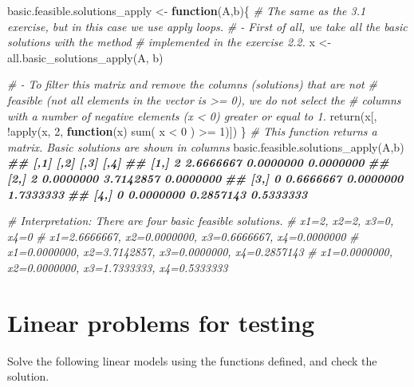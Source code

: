 \documentclass[
]{article}
\newenvironment{Shaded}{\begin{snugshade}}{\end{snugshade}}
\newcommand{\CommentTok}[1]{\textcolor[rgb]{0.56,0.35,0.01}{\textit{#1}}}
\newcommand{\ControlFlowTok}[1]{\textcolor[rgb]{0.13,0.29,0.53}{\textbf{#1}}}
\newcommand{\DecValTok}[1]{\textcolor[rgb]{0.00,0.00,0.81}{#1}}
\newcommand{\DocumentationTok}[1]{\textcolor[rgb]{0.56,0.35,0.01}{\textbf{\textit{#1}}}}
\newcommand{\FunctionTok}[1]{\textcolor[rgb]{0.00,0.00,0.00}{#1}}
\newcommand{\NormalTok}[1]{#1}
\newcommand{\OtherTok}[1]{\textcolor[rgb]{0.56,0.35,0.01}{#1}}
\newcommand{\SpecialCharTok}[1]{\textcolor[rgb]{0.00,0.00,0.00}{#1}}
\begin{document}
\begin{Shaded}
\begin{Highlighting}[]
\NormalTok{basic.feasible.solutions\_apply }\OtherTok{\textless{}{-}} \ControlFlowTok{function}\NormalTok{(A,b)\{}
  \CommentTok{\# The same as the 3.1 exercise, but in this case we use apply loops.}
  \CommentTok{\# {-} First of all, we take all the basic solutions with the method}
  \CommentTok{\# implemented in the exercise 2.2.}
\NormalTok{  x }\OtherTok{\textless{}{-}} \FunctionTok{all.basic\_solutions\_apply}\NormalTok{(A, b)}
  
  \CommentTok{\# {-} To filter this matrix and remove the columns (solutions) that are not }
  \CommentTok{\# feasible (not all elements in the vector is \textgreater{}= 0), we do not select the }
  \CommentTok{\# columns with a number of negative elements (x \textless{} 0) greater or equal to 1.}
  \FunctionTok{return}\NormalTok{(x[, }\SpecialCharTok{!}\FunctionTok{apply}\NormalTok{(x, }\DecValTok{2}\NormalTok{, }\ControlFlowTok{function}\NormalTok{(x) }\FunctionTok{sum}\NormalTok{( x }\SpecialCharTok{\textless{}} \DecValTok{0}\NormalTok{ ) }\SpecialCharTok{\textgreater{}=} \DecValTok{1}\NormalTok{)])}
\NormalTok{\} }
\CommentTok{\# This function returns a matrix. Basic solutions are shown in columns}
\FunctionTok{basic.feasible.solutions\_apply}\NormalTok{(A,b)  }
\DocumentationTok{\#\#      [,1]      [,2]      [,3]      [,4]}
\DocumentationTok{\#\# [1,]    2 2.6666667 0.0000000 0.0000000}
\DocumentationTok{\#\# [2,]    2 0.0000000 3.7142857 0.0000000}
\DocumentationTok{\#\# [3,]    0 0.6666667 0.0000000 1.7333333}
\DocumentationTok{\#\# [4,]    0 0.0000000 0.2857143 0.5333333}

\CommentTok{\# Interpretation: There are four basic feasible solutions. }
\CommentTok{\# x1=2, x2=2, x3=0, x4=0}
\CommentTok{\# x1=2.6666667, x2=0.0000000, x3=0.6666667, x4=0.0000000}
\CommentTok{\# x1=0.0000000, x2=3.7142857, x3=0.0000000, x4=0.2857143}
\CommentTok{\# x1=0.0000000, x2=0.0000000, x3=1.7333333, x4=0.5333333}
\end{Highlighting}
\end{Shaded}

\hypertarget{linear-problems-for-testing}{%
\section{Linear problems for
testing}\label{linear-problems-for-testing}}

Solve the following linear models using the functions defined, and check
the solution.
\end{document}
